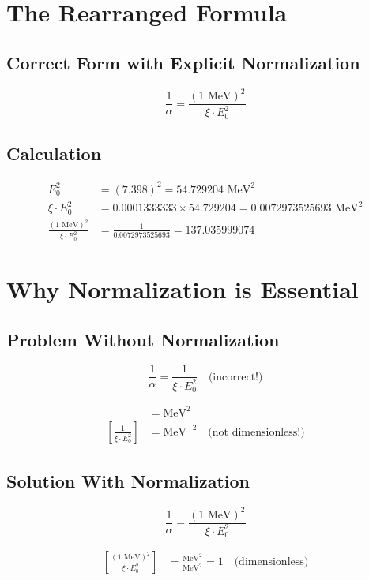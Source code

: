 \documentclass[12pt,a4paper]{article}
\theoremstyle{definition}
\begin{document}
	\section*{The Rearranged Formula}
	
	\subsection*{Correct Form with Explicit Normalization}
	
	\[
	\boxed{\frac{1}{\alpha} = \frac{(1 \text{ MeV})^2}{\xi \cdot E_0^2}}
	\]
	
	\subsection*{Calculation}
	
	\begin{align*}
		E_0^2 &= (7.398)^2 = 54.729204 \text{ MeV}^2 \\
		\xi \cdot E_0^2 &= 0.0001333333 \times 54.729204 = 0.0072973525693 \text{ MeV}^2 \\
		\frac{(1 \text{ MeV})^2}{\xi \cdot E_0^2} &= \frac{1}{0.0072973525693} = 137.035999074
	\end{align*}
	
	\section*{Why Normalization is Essential}
	
	\subsection*{Problem Without Normalization}
	
	\[
	\frac{1}{\alpha} = \frac{1}{\xi \cdot E_0^2} \quad \text{(incorrect!)}
	\]
	
	\begin{align*}
		[\xi \cdot E_0^2] &= \text{MeV}^2 \\
		\left[\frac{1}{\xi \cdot E_0^2}\right] &= \text{MeV}^{-2} \quad \text{(not dimensionless!)}
	\end{align*}
	
	\subsection*{Solution With Normalization}
	
	\[
	\frac{1}{\alpha} = \frac{(1 \text{ MeV})^2}{\xi \cdot E_0^2}
	\]
	
	\begin{align*}
		\left[\frac{(1 \text{ MeV})^2}{\xi \cdot E_0^2}\right] &= \frac{\text{MeV}^2}{\text{MeV}^2} = 1 \quad \text{(dimensionless)}
	\end{align*}
	
\end{document}
